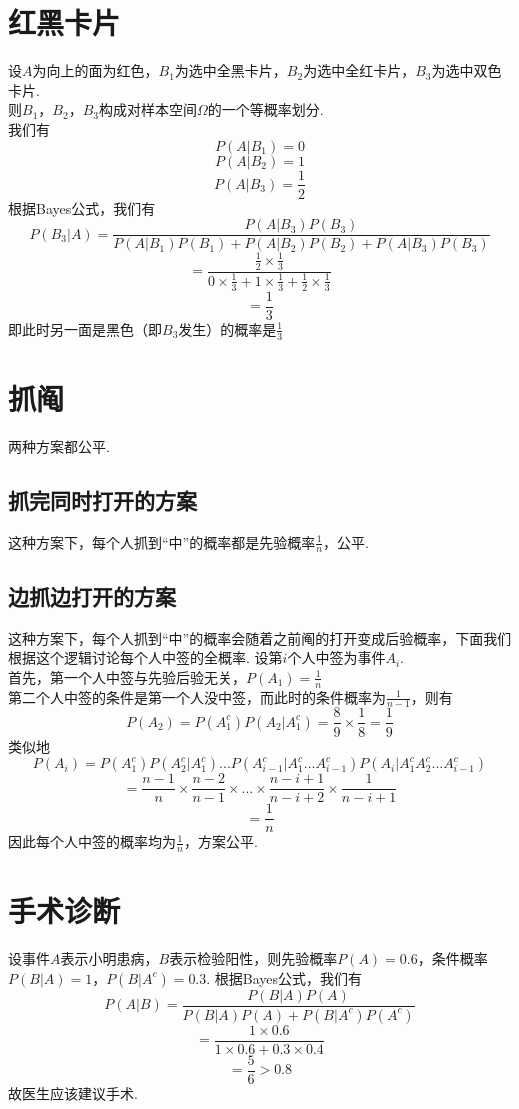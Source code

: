 \documentclass{article}
\begin{document}
\begin{CJK}{UTF8}{gbsn}
\section{红黑卡片}
设$A$为向上的面为红色，$B_{1}$为选中全黑卡片，$B_{2}$为选中全红卡片，$B_{3}$为选中双色卡片.
\\则$B_{1}$，$B_{2}$，$B_{3}$构成对样本空间$\Omega$的一个等概率划分.
\\我们有
$$ P(A|B_{1})=0 $$
$$ P(A|B_{2})=1 $$
$$ P(A|B_{3})=\frac{1}{2} $$
根据Bayes公式，我们有
$$ P(B_{3}|A)=\frac{P(A|B_{3})P(B_{3})}{P(A|B_{1})P(B_{1})+P(A|B_{2})P(B_{2})+P(A|B_{3})P(B_{3})} $$
$$ =\frac{\frac{1}{2}\times \frac{1}{3}}{0\times \frac{1}{3}+1\times \frac{1}{3}+\frac{1}{2}\times \frac{1}{3}} $$
$$ =\frac{1}{3} $$
即此时另一面是黑色（即$B_{3}$发生）的概率是$\frac{1}{3}$
\section{抓阄}
两种方案都公平.
\subsection{抓完同时打开的方案}
这种方案下，每个人抓到“中”的概率都是先验概率$\frac{1}{n}$，公平.
\subsection{边抓边打开的方案}
这种方案下，每个人抓到“中”的概率会随着之前阄的打开变成后验概率，下面我们根据这个逻辑讨论每个人中签的全概率. 设第$i$个人中签为事件$A_{i}$. 
\\首先，第一个人中签与先验后验无关，$P(A_{1})=\frac{1}{n}$
\\第二个人中签的条件是第一个人没中签，而此时的条件概率为$\frac{1}{n-1}$，则有
$$ P(A_{2})=P(A_{1}^{c})P(A_{2}|A_{1}^{c})=\frac{8}{9}\times \frac{1}{8}=\frac{1}{9} $$
类似地
$$ P(A_{i})=P(A_{1}^{c})P(A_{2}^{c}|A_{1}^{c})...P(A_{i-1}^{c}|A_{1}^{c}...A_{i-1}^{c})P(A_{i}|A_{1}^{c}A_{2}^{c}...A_{i-1}^{c}) $$
$$ =\frac{n-1}{n}\times \frac{n-2}{n-1}\times ...\times \frac{n-i+1}{n-i+2}\times \frac{1}{n-i+1}$$
$$ =\frac{1}{n} $$
因此每个人中签的概率均为$\frac{1}{n}$，方案公平.
\section{手术诊断}
设事件$A$表示小明患病，$B$表示检验阳性，则先验概率$P(A)=0.6$，条件概率$P(B|A)=1$，$P(B|A^{c})=0.3$. 根据Bayes公式，我们有
$$ P(A|B)=\frac{P(B|A)P(A)}{P(B|A)P(A)+P(B|A^{c})P(A^{c})} $$
$$ =\frac{1\times 0.6}{1\times 0.6+0.3\times 0.4} $$
$$ =\frac{5}{6}>0.8 $$
故医生应该建议手术.

\end{CJK}
\end{document}
